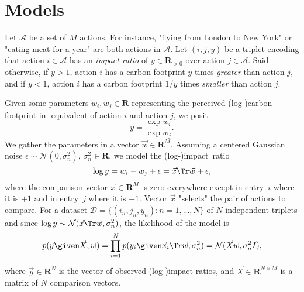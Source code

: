 \section{Models}%
\label{clm:sec:models}

Let $ \mathcal{A} $ be a set of $M$ actions.
For instance, "flying from London to New York" or "eating meat for a year" are both actions in $ \mathcal{A}$.
Let $ (i, j, y) $ be a triplet encoding that action $i \in \mathcal{A}$ has an \textit{impact ratio} of $y \in \mathbf{R}_{>0}$ over action $j \in \mathcal{A}$.
Said otherwise, if $y > 1$, action $i$ has a carbon footprint $y$ times \textit{greater} than action $j$, and if $y < 1$, action $i$ has a carbon footprint $1/y$ times \textit{smaller} than action $j$.

Given some parameters $w_i, w_j \in \mathbf{R}$ representing the perceived (log-)carbon footprint in \COtwo-equivalent of action $i$ and action $j$, we posit
\begin{equation*}
	y = \frac{\exp w_i}{\exp w_j}.
\end{equation*}
We gather the parameters in a vector $\vec{w} \in \mathbf{R}^M$.
Assuming a centered Gaussian noise $\epsilon \sim \mathcal{N}(0, \sigma^2_n)$, $\sigma_n^2 \in \mathbf{R}$, we model the (log-)impact~ratio
\begin{equation}
	\log y = w_i - w_j + \epsilon = \vec{x}\Tr\vec{w} + \epsilon,
\end{equation}
where the comparison vector $\vec{x} \in \mathbf{R}^M$ is zero everywhere except in entry~$i$ where it is $+1$ and in entry~$j$ where it is $-1$.
Vector $\vec{x}$ "selects" the pair of actions to compare.
For a dataset $ \mathcal{D} = \{ (i_n, j_n, y_n) : n = 1, ..., N \}$ of $N$ independent triplets and since \mbox{$\log y \sim \mathcal{N}(\vec{x}\Tr \vec{w}, \sigma^2_n)$}, the likelihood of the model is
\begin{equation*}
	p(\vec{y} \given \vec{X}, \vec{w}) = \prod_{i=1}^N p(y_i \given \vec{x}_i\Tr \vec{w}, \sigma_n^2) = \mathcal{N}(\vec{X} \vec{w}, \sigma_n^2\vec{I}),
\end{equation*}
where $\vec{y} \in \mathbf{R}^N$ is the vector of observed (log-)impact ratios, and $\vec{X} \in \mathbf{R}^{N \times M}$ is a matrix of $N$ comparison vectors.

